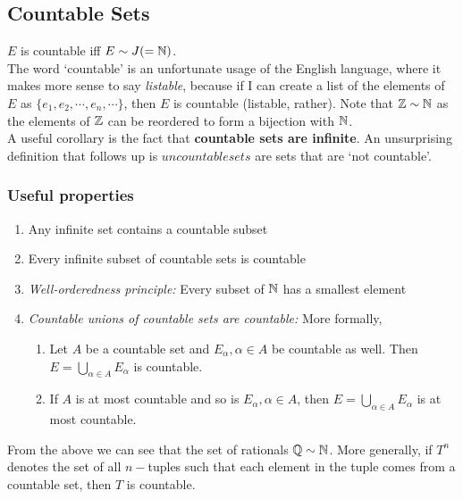 \subsection{Countable Sets}
$E$ is countable iff $E\sim J (=\mathbb{N})$. \\
The word `countable' is an unfortunate usage of the English language, where it makes more sense to say \textit{listable}, because if I can create a list of the elements of $E$ as $\{e_1,e_2,\cdots,e_n,\cdots\}$, then $E$ is countable (listable, rather). 
Note that $\mathbb{Z} \sim \mathbb{N}$ as the elements of $\mathbb{Z}$ can be reordered to form a bijection with $\mathbb{N}$.\\
A useful corollary is the fact that \textbf{countable sets are infinite}. An unsurprising definition that follows up is $uncountable sets$ are sets that are `not countable'.

\subsubsection{Useful properties}
\begin{enumerate}[label=P\arabic*.]
\item Any infinite set contains a countable subset
\item Every infinite subset of countable sets is countable
\item \textit{Well-orderedness principle:} Every subset of $\mathbb{N}$ has a smallest element
\item \textit{Countable unions of countable sets are countable:} 
More formally,
\begin{enumerate}[label=P4.\arabic*]
    \item Let $A$ be a countable set and $E_\alpha,\alpha\in A$ be countable as well. Then $E=\bigcup\limits_{\alpha\in A} E_\alpha$ is countable.
    \item If $A$ is at most countable and so is $E_\alpha,\alpha\in A$, then $E=\bigcup\limits_{\alpha\in A} E_\alpha$ is at most countable.
\end{enumerate}
\end{enumerate}

From the above we can see that the set of rationals $\mathbb{Q}\sim \mathbb{N}$. More generally, if $T^n$ denotes the set of all $n-$tuples such that each element in the tuple comes from a countable set, then $T$ is countable.

